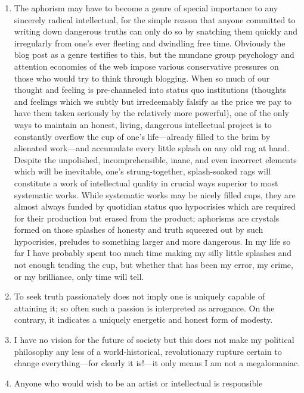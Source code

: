 \documentclass[a4paper,12pt,margin=.5in]{article}
\begin{document}
\begin{enumerate}
\def\labelenumi{\arabic{enumi}.}
\item
  The aphorism may have to become a genre of special importance to any
  sincerely radical intellectual, for the simple reason that anyone
  committed to writing down dangerous truths can only do so by snatching
  them quickly and irregularly from one's ever fleeting and dwindling
  free time. Obviously the blog post as a genre testifies to this, but
  the mundane group psychology and attention economies of the web impose
  various conservative pressures on those who would try to think through
  blogging. When so much of our thought and feeling is pre-channeled
  into status quo institutions (thoughts and feelings which we subtly
  but irredeemably falsify as the price we pay to have them taken
  seriously by the relatively more powerful), one of the only ways to
  maintain an honest, living, dangerous intellectual project is to
  constantly overflow the cup of one's life---already filled to the brim
  by alienated work---and accumulate every little splash on any old rag
  at hand. Despite the unpolished, incomprehensible, inane, and even
  incorrect elements which will be inevitable, one's strung-together,
  splash-soaked rags will constitute a work of intellectual quality in
  crucial ways superior to most systematic works. While systematic works
  may be nicely filled cups, they are almost always funded by quotidian
  status quo hypocrisies which are required for their production but
  erased from the product; aphorisms are crystals formed on those
  splashes of honesty and truth squeezed out by such hypocrisies,
  preludes to something larger and more dangerous. In my life so far I
  have probably spent too much time making my silly little splashes and
  not enough tending the cup, but whether that has been my error, my
  crime, or my brilliance, only time will tell.
\item
  To seek truth passionately does not imply one is uniquely capable of
  attaining it; so often such a passion is interpreted as arrogance. On
  the contrary, it indicates a uniquely energetic and honest form of
  modesty.
\item
  I have no vision for the future of society but this does not make my
  political philosophy any less of a world-historical, revolutionary
  rupture certain to change everything---for clearly it is!---it only
  means I am not a megalomaniac.
\item
  Anyone who would wish to be an artist or intellectual is responsible

\end{enumerate}
\end{document}
